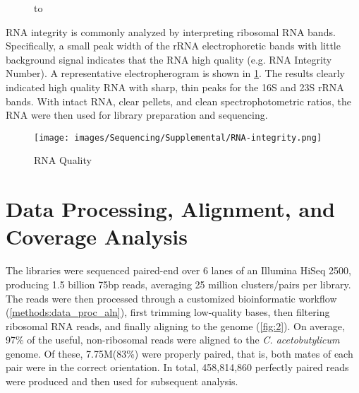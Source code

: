 \begin{figure}
\hbox to 
\end{figure}

RNA integrity is commonly analyzed by interpreting ribosomal RNA bands. Specifically, a small peak width of the rRNA electrophoretic bands with little background signal indicates that the RNA high quality (e.g. RNA Integrity Number). A representative electropherogram is shown in \ref{fig:3}. The results clearly indicated high quality RNA with sharp, thin peaks for the 16S and 23S rRNA bands. With intact RNA, clear pellets, and clean spectrophotometric ratios, the RNA were then used for library preparation and sequencing. 

\begin{figure}
\texttt{[image: images/Sequencing/Supplemental/RNA-integrity.png]}
\caption{RNA Quality}\label{fig:3}
\end{figure}

\section{Data Processing, Alignment, and Coverage Analysis}
The libraries were sequenced paired-end over 6 lanes of an Illumina HiSeq 2500, producing 1.5 billion 75bp reads, averaging 25 million clusters/pairs per library. The reads were then processed through a customized bioinformatic workflow (\ref{methods:data_proc_aln}), first trimming low-quality bases, then filtering ribosomal RNA reads, and finally aligning to the genome (\ref{fig:2}). On average, 97\% of the useful, non-ribosomal reads were aligned to the \textit{C. acetobutylicum} genome. Of these, 7.75M(83\%) were properly paired, that is, both mates of each pair were in the correct orientation. In total, 458,814,860 perfectly paired reads were produced and then used for subsequent analysis. 

